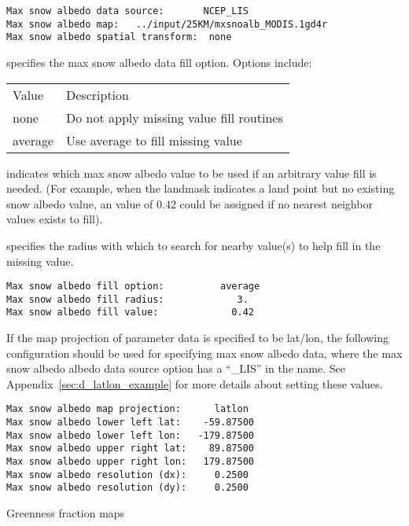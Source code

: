  \begin{Verbatim}[frame=single]
Max snow albedo data source:       NCEP_LIS
Max snow albedo map:   ../input/25KM/mxsnoalb_MODIS.1gd4r
Max snow albedo spatial transform:  none
 \end{Verbatim}

 
  specifies the max snow albedo
 data fill option.  Options include:

 \begin{tabular}{ll}
 Value   & Description                               \\
 none    &  Do not apply missing value fill routines \\
 average &  Use average to fill missing value        \\
 \end{tabular}

  indicates which max snow albedo
 value to be used if an arbitrary value fill is needed. 
 (For example, when the landmask indicates a land point but no existing 
 snow albedo value, an value of 0.42 could be assigned if 
 no nearest neighbor values exists to fill).

  specifies the radius with which
 to search for nearby value(s) to help fill in the missing value.
 

 \begin{Verbatim}[frame=single]
Max snow albedo fill option:          average
Max snow albedo fill radius:             3.
Max snow albedo fill value:             0.42
 \end{Verbatim}

 
 If the map projection of parameter data is specified to be lat/lon,
 the following configuration should be used for specifying max snow 
 albedo data, where the max snow albedo
 albedo data source option has a ``\_LIS'' in the name.
 See Appendix~\ref{sec:d_latlon_example} for more details about
 setting these values.
 

 \begin{Verbatim}[frame=single]
Max snow albedo map projection:      latlon
Max snow albedo lower left lat:    -59.87500
Max snow albedo lower left lon:   -179.87500
Max snow albedo upper right lat:    89.87500
Max snow albedo upper right lon:   179.87500
Max snow albedo resolution (dx):     0.2500
Max snow albedo resolution (dy):     0.2500
 \end{Verbatim}

 
 Greenness fraction maps

